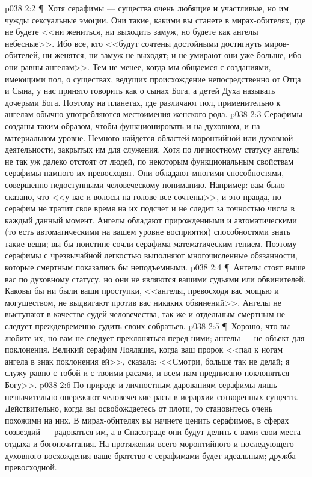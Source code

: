 \vs p038 2:2 \P\ Хотя серафимы --- существа очень любящие и участливые, но им чужды сексуальные эмоции. Они такие, какими вы станете в мирах\hyp{}обителях, где не будете <<ни жениться, ни выходить замуж, но будете как ангелы небесные>>. Ибо все, кто <<будут сочтены достойными достигнуть миров\hyp{}обителей, ни женятся, ни замуж не выходят; и не умирают они уже больше, ибо они равны ангелам>>. Тем не менее, когда мы общаемся с созданиями, имеющими пол, о существах, ведущих происхождение непосредственно от Отца и Сына, у нас принято говорить как о сынах Бога, а детей Духа называть дочерьми Бога. Поэтому на планетах, где различают пол, применительно к ангелам обычно употребляются местоимения женского рода.
\vs p038 2:3 Серафимы созданы таким образом, чтобы функционировать и на духовном, и на материальном уровне. Немного найдется областей моронтийной или духовной деятельности, закрытых им для служения. Хотя по личностному статусу ангелы не так уж далеко отстоят от людей, по некоторым функциональным свойствам серафимы намного их превосходят. Они обладают многими способностями, совершенно недоступными человеческому пониманию. Например: вам было сказано, что <<у вас и волосы на голове все сочтены>>, и это правда, но серафим не тратит свое время на их подсчет и не следит за точностью числа в каждый данный момент. Ангелы обладают прирожденными и автоматическими (то есть автоматическими на вашем уровне восприятия) способностями знать такие вещи; вы бы поистине сочли серафима математическим гением. Поэтому серафимы с чрезвычайной легкостью выполняют многочисленные обязанности, которые смертным показались бы неподъемными.
\vs p038 2:4 \P\ Ангелы стоят выше вас по духовному статусу, но они не являются вашими судьями или обвинителей. Каковы бы ни были ваши проступки, <<ангелы, превосходя вас мощью и могуществом, не выдвигают против вас никаких обвинений>>. Ангелы не выступают в качестве судей человечества, так же и отдельным смертным не следует преждевременно судить своих собратьев.
\vs p038 2:5 \P\ Хорошо, что вы любите их, но вам не следует преклоняться перед ними; ангелы --- не объект для поклонения. Великий серафим Лоялация, когда ваш пророк <<пал к ногам ангела в знак поклонения ей>>, сказала: <<Смотри, больше так не делай; я служу равно с тобой и с твоими расами, и всем нам предписано поклоняться Богу>>.
\vs p038 2:6 По природе и личностным дарованиям серафимы лишь незначительно опережают человеческие расы в иерархии сотворенных существ. Действительно, когда вы освобождаетесь от плоти, то становитесь очень похожими на них. В мирах\hyp{}обителях вы начнете ценить серафимов, в сферах созвездий --- радоваться им, а в Спасограде они будут делить с вами свои места отдыха и богопочитания. На протяжении всего моронтийного и последующего духовного восхождения ваше братство с серафимами будет идеальным; дружба --- превосходной.
